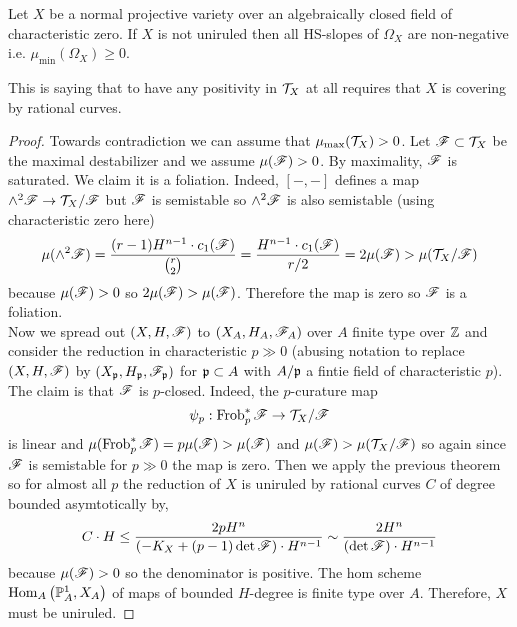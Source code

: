 \documentclass[12pt]{article}
\begin{document}
\begin{theorem}
Let $X$ be a normal projective variety over an algebraically closed field of characteristic zero. If $X$ is not uniruled then all HS-slopes of $\Omega_X$ are non-negative i.e. $\mu_{\min}(\Omega_X) \ge 0$.
\end{theorem}

This is saying that to have any positivity in $\mathcal{T}_X$ at all requires that $X$ is covering by rational curves.


\begin{proof}
Towards contradiction we can assume that $\mu_{\max}(\mathcal{T}_X) > 0$.
Let $\mathscr{F} \subset \mathcal{T}_X$ be the maximal destabilizer and we assume $\mu(\mathscr{F}) > 0$. By maximality, $\mathscr{F}$ is saturated. We claim it is a foliation. Indeed, $[-,-]$ defines a map $\wedge^2 \mathscr{F} \to \mathcal{T}_X / \mathscr{F}$ but $\mathscr{F}$ is semistable so $\wedge^2 \mathscr{F}$ is also semistable (using characteristic zero here)
\[ \mu(\wedge^2 \mathscr{F}) = \frac{(r-1) H^{n-1} \cdot c_1(\mathscr{F})}{{r \choose 2}} = \frac{H^{n-1} \cdot c_1(\mathscr{F})}{r/2} = 2 \mu(\mathscr{F}) > \mu(\mathcal{T}_X / \mathscr{F}) \]
because $\mu(\mathscr{F}) > 0$ so $2 \mu(\mathscr{F}) > \mu(\mathscr{F})$. Therefore the map is zero so $\mathscr{F}$ is a foliation.
\bigskip\\
Now we spread out $(X, H, \mathscr{F})$ to $(X_A, H_A, \mathscr{F}_A)$ over $A$ finite type over $\mathbb{Z}$ and consider the reduction in characteristic $p \gg 0$ (abusing notation to replace $(X, H, \mathscr{F})$ by $(X_{\mathfrak{p}}, H_{\mathfrak{p}}, \mathscr{F}_{\mathfrak{p}})$ for $\mathfrak{p} \subset A$ with $A / \mathfrak{p}$ a fintie field of characteristic $p$). The claim is that $\mathscr{F}$ is $p$-closed. Indeed, the $p$-curature map
\[ \psi_p : \operatorname{\mathrm{Frob}}_p^* \mathscr{F} \to \mathcal{T}_X / \mathscr{F} \]
is linear and $\mu(\operatorname{\mathrm{Frob}}_p^* \mathscr{F}) = p \mu(\mathscr{F}) > \mu(\mathscr{F})$ and $\mu(\mathscr{F}) > \mu(\mathcal{T}_X / \mathscr{F})$ so again since $\mathscr{F}$ is semistable for $p \gg 0$ the map is zero. Then we apply the previous theorem so for almost all $p$ the reduction of $X$ is uniruled by rational curves $C$ of degree bounded asymtotically by,
\[ C \cdot H \le \frac{2 p H^n}{(-K_X + (p-1) \det{\mathscr{F}}) \cdot H^{n-1}} \sim \frac{2 H^n}{(\det{\mathscr{F}}) \cdot H^{n-1}} \]
because $\mu(\mathscr{F}) > 0$ so the denominator is positive. The hom scheme $\mathrm{Hom}_{A} \left( \mathbb{P}^1_A, X_A \right)$ of maps of bounded $H$-degree is finite type over $A$. Therefore, $X$ must be uniruled.
\end{proof}
\end{document}
